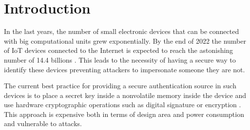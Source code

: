 \chapter{Introduction}


In the last years, the number of small electronic devices that can be connected with big computational units grew exponentially. By the end of 2022 the number of IoT devices connected to the Internet is expected to reach the astonishing number of 14.4 billions \cite{IoT_state}. This leads to the necessity of having a secure way to identify these devices preventing attackers to impersonate someone they are not. 

The current best practice for providing a secure authentication source in such devices is to place a secret key inside a nonvolatile memory inside the device and use hardware cryptographic operations such as digital signature or encryption \cite{PUF_IEEE_Herder}. This approach is expensive both in terms of design area and power consumption and vulnerable to attacks. 

